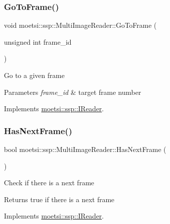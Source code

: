 \subsubsection{\texorpdfstring{Go\+To\+Frame()}{GoToFrame()}}
{\footnotesize\ttfamily void moetsi\+::ssp\+::\+Multi\+Image\+Reader\+::\+Go\+To\+Frame (\begin{DoxyParamCaption}\item[{unsigned int}]{frame\+\_\+id }\end{DoxyParamCaption})\hspace{0.3cm}{\ttfamily [virtual]}}

Go to a given frame 
\begin{DoxyParams}{Parameters}
{\em frame\+\_\+id} & target frame number \\
\hline
\end{DoxyParams}


Implements \hyperlink{classmoetsi_1_1ssp_1_1IReader_a6f1be3c06538992cca6d550bd9566681}{moetsi\+::ssp\+::\+I\+Reader}.

\mbox{\label{classmoetsi_1_1ssp_1_1MultiImageReader_a04240c98d28d8949fca4ecdcb04f04f5}} 
\subsubsection{\texorpdfstring{Has\+Next\+Frame()}{HasNextFrame()}}
{\footnotesize\ttfamily bool moetsi\+::ssp\+::\+Multi\+Image\+Reader\+::\+Has\+Next\+Frame (\begin{DoxyParamCaption}{ }\end{DoxyParamCaption})\hspace{0.3cm}{\ttfamily [virtual]}}

Check if there is a next frame \begin{DoxyReturn}{Returns}
true if there is a next frame 
\end{DoxyReturn}


Implements \hyperlink{classmoetsi_1_1ssp_1_1IReader_af9186ba41e136dc4ec3242b5dd55fa04}{moetsi\+::ssp\+::\+I\+Reader}.

\mbox{\label{classmoetsi_1_1ssp_1_1MultiImageReader_a472e2b97ce7a1c2485abd14c276bb8fe}} 
